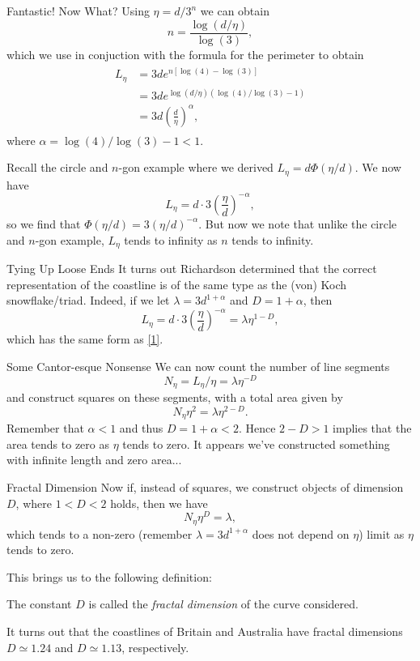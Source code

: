 \documentclass[10pt]{beamer}
\begin{document}
\begin{frame}{Fantastic! Now What?}
  Using $\eta = d/3^n$ we can obtain 
  $$n = \frac{\log(d/\eta)}{\log(3)},$$
  which we use in conjuction with the formula for the perimeter to obtain
  \begin{align*}
    \begin{split}
      L_{\eta} &= 3de^{n[\log(4) - \log(3)]}\\
      &= 3de^{\log(d/\eta)(\log(4)/\log(3) - 1)}\\
      &= 3d\left(\frac{d}{\eta}\right)^{\alpha},
    \end{split}
  \end{align*}
  where $\alpha = \log(4)/\log(3) - 1 < 1.$
\end{frame}

\begin{frame}{}
  Recall the circle and $n$-gon example where we derived $L_{\eta} = d\Phi(\eta/d)$.
  We now have $$L_{\eta} = d\cdot 3\left(\frac{\eta}{d}\right)^{-\alpha},$$
  so we find that $\Phi(\eta/d) = 3(\eta/d)^{-\alpha}$.
  But now we note that unlike the circle and $n$-gon example, $L_{\eta}$ tends to infinity as $n$ tends to infinity.
\end{frame}

\begin{frame}{Tying Up Loose Ends}
  It turns out Richardson determined that the correct representation of the coastline is of the same type as the (von) Koch snowflake/triad.
  Indeed, if we let $\lambda = 3d^{1+\alpha}$ and $D = 1 + \alpha$, then $$L_{\eta} = d\cdot 3\left(\frac{\eta}{d}\right)^{-\alpha} = \lambda\eta^{1 - D},$$
  which has the same form as \eqref{1}.
\end{frame}

\begin{frame}{Some Cantor-esque Nonsense}
  We can now count the number of line segments 
  $$N_{\eta} = L_{\eta}/\eta = \lambda\eta^{-D}$$
  and construct squares on these segments, with a total area given by
  $$N_{\eta}\eta^2 = \lambda\eta^{2-D}.$$
  Remember that $\alpha < 1$ and thus $D = 1 + \alpha < 2$.
  Hence $2 - D > 1$ implies that the area tends to zero as $\eta$ tends to zero.
  It appears we've constructed something with infinite length and zero area...
\end{frame}

\begin{frame}{Fractal Dimension}
  Now if, instead of squares, we construct objects of dimension $D$, where $1 < D < 2$ holds, then we have
  $$N_{\eta}\eta^D = \lambda,$$ 
  which tends to a non-zero (remember $\lambda = 3d^{1+\alpha}$ does not depend on $\eta$) limit as $\eta$ tends to zero.
  
  This brings us to the following definition:
  \begin{defn}
    The constant $D$ is called the {\it fractal dimension} of the curve considered.
  \end{defn}
  
  It turns out that the coastlines of Britain and Australia have fractal dimensions $D \simeq 1.24$ and $D \simeq 1.13$, respectively.  
\end{frame}
\end{document}
